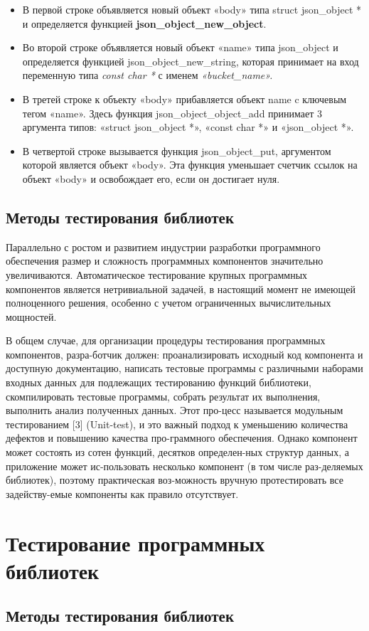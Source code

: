 \begin{itemize}
    \item	В первой строке объявляется новый объект «body» типа struct json\_object * и определяется функцией \textbf{json\_object\_new\_object\(\)}.
    \item	{Во второй строке объявляется новый объект «name» типа json\_object и определяется функцией json\_object\_new\_string, которая принимает на вход переменную типа \textit{const char *} с именем \textit{«bucket\_name».}}
    \item	В третей строке к объекту «body» прибавляется объект name c ключевым тегом «name». Здесь функция json\_object\_object\_add принимает 3 аргумента типов: «struct json\_object *», «const char *» и «json\_object *».
    \item В четвертой строке вызывается функция json\_object\_put, аргументом которой является объект «body». Эта функция уменьшает счетчик ссылок на объект «body» и освобождает его, если он достигает нуля.
\end{itemize}

\subsection{Методы тестирования библиотек}\label{subsec:ch1/sec1/sub1}

Параллельно с ростом и развитием индустрии разработки программного обеспечения размер и сложность программных компонентов значительно увеличиваются. Автоматическое тестирование крупных программных компонентов является нетривиальной задачей, в настоящий момент не имеющей полноценного решения, особенно с учетом ограниченных вычислительных мощностей. 

В общем случае, для организации процедуры тестирования программных компонентов, разра-ботчик должен: проанализировать исходный код компонента и доступную документацию, написать тестовые программы с различными наборами входных данных для подлежащих тестированию функций библиотеки, скомпилировать тестовые программы, собрать результат их выполнения, выполнить анализ полученных данных. Этот про-цесс называется модульным тестированием [3] (Unit-test), и это важный подход к уменьшению количества дефектов и повышению качества про-граммного обеспечения. Однако компонент может состоять из сотен функций, десятков определен-ных структур данных, а приложение может ис-пользовать несколько компонент (в том числе раз-деляемых библиотек), поэтому практическая воз-можность вручную протестировать все задейству-емые компоненты как правило отсутствует.


\section{Тестирование программных библиотек}\label{sec:ch1/sec3}


\subsection{Методы тестирования библиотек}\label{subsec:ch1/sec3/sub1}


